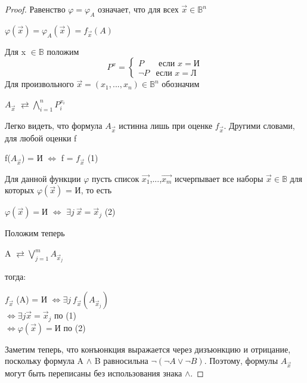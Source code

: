 \begin{proof}
Равенство $\varphi = \varphi_A$ означает, что для всех $\vec{x} \in \mathbb{B}^n$
\begin{center}
$\varphi (\vec{x}) = \varphi_A (\vec{x}) = f_{\vec{x}} (A)$
\end{center}
Для x $\in \mathbb{B}$ положим
\begin{equation*}
P^x= 
    \begin{cases}
        P  &\text{ если $x = $И} \\
        \neg P &\text{если $x = $Л}
    \end{cases}
\end{equation*}
Для произвольного $\vec{x} = (x_1,...,x_n) \in \mathbb{B}^n$ обозначим
\begin{center}
$A_{\vec{x}}$   $\rightleftarrows  \bigwedge_{i=1}^n P_i^{x_i}$
\end{center}
Легко видеть, что формула $A_{\vec{x}}$ истинна лишь при оценке $f_{\vec{x}}$. Другими словами, для любой оценки f
\begin{center}
f($A_{\vec{x}}$) = И $\Longleftrightarrow$ f = $f_{\vec{x}}$ (1)
\end{center}
Для данной функции $\varphi$ пусть список $\vec{x_1}$,...,$\vec{x_m}$ исчерпывает все наборы $\vec{x} \in \mathbb{B}$ для которых $\varphi(\vec{x})$ = И, то есть 
\begin{center}
$\varphi(\vec{x}) = $И $\Longleftrightarrow$ $\exists j \ \vec{x} = \vec{x}_j$ (2)
\end{center}
Положим теперь
\begin{center}
A $\rightleftarrows \bigvee_{j=1}^m A_{\vec{x}_j}$
\end{center}
тогда: 
\begin{center}
$f_{\vec{x}}$ (A) = И $\Longleftrightarrow \exists j \ f_{\vec{x}} (A_{\vec{x}_j})$\\
$\Longleftrightarrow \exists j \vec{x} = \vec{x}_j$ по (1)\\
$\Longleftrightarrow \varphi (\vec{x}) =$И по (2)
\end{center}
Заметим теперь, что конъюнкция выражается через дизъюнкцию и
отрицание, поскольку формула A $\land$ B равносильна $\neg(\neg A \lor \neg B)$.  Поэтому, формулы $A_{\vec{x}}$ могут быть переписаны без использования знака $\land$. 
\end{proof}